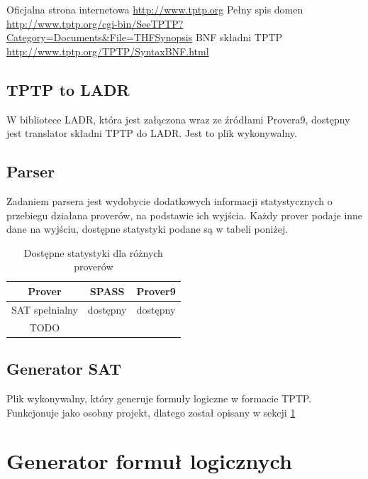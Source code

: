 \documentclass[a4paper,12pt]{article}
\begin{document}
\noindent
Oficjalna strona internetowa \url{http://www.tptp.org}
\newline
Pełny spis domen \url{http://www.tptp.org/cgi-bin/SeeTPTP?Category=Documents&File=THFSynopsis}
\newline
BNF składni TPTP \url{http://www.tptp.org/TPTP/SyntaxBNF.html}



\subsection{TPTP to LADR}

W bibliotece \gls{LADR}, która jest załączona wraz ze źródłami Provera9, dostępny jest translator składni TPTP do LADR. Jest to plik wykonywalny.

\subsection{Parser}

Zadaniem parsera jest wydobycie dodatkowych informacji statystycznych o przebiegu działana proverów, na podstawie ich wyjścia.
\newline
Każdy prover podaje inne dane na wyjściu, dostępne statystyki podane są w tabeli poniżej.

\begin{table}[ht]
  \centering
  \caption{Dostępne statystyki dla różnych proverów}
  \begin{tabular}{ |c|c|c| }
    \hline
    Prover & SPASS & Prover9 \\
    \hline
    SAT spełnialny & dostępny & dostępny \\
    \hline
    TODO & & \\
    \hline
  \end{tabular}
\end{table}


\subsection{Generator SAT}

Plik wykonywalny, który generuje formuły logiczne w formacie TPTP. Funkcjonuje jako osobny projekt, dlatego został opisany w sekcji \ref{LFG}

\section{Generator formuł logicznych}\label{LFG}
\end{document}
